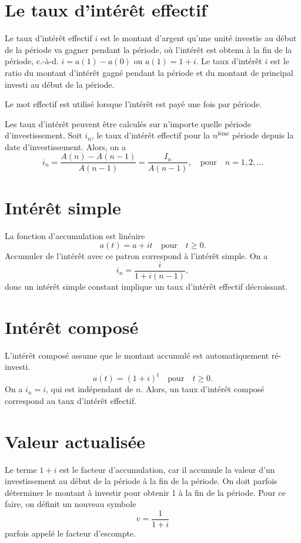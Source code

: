 \section{Le taux d'intérêt effectif}

\begin{definition}{}{}
	Le taux d'intérêt effectif $i$ est le montant d'argent qu'une unité investie au début de la période va gagner pendant la période, où l'intérêt est obtenu à la fin de la période, c.-à-d. $i = a(1) - a(0)$ ou $a(1) = 1 + i$.
	\tcblower
	Le taux d'intérêt $i$ est le ratio du montant d'intérêt gagné pendant la période et du montant de principal investi au début de la période. 
\end{definition}

Le mot effectif est utilisé lorsque l'intérêt est payé une fois par période. 

Les taux d'intérêt peuvent être calculés sur n'importe quelle période d'investissement. Soit $i_n$, le taux d'intérêt effectif pour la $n^\text{ième}$ période depuis la date d'investissement. Alors, on a 
$$i_n = \frac{A(n) - A(n-1)}{A(n-1)} = \frac{I_n}{A(n-1)}, \quad \text{pour} \quad n = 1, 2, \dots$$

\section{Intérêt simple}

La fonction d'accumulation est linéaire
$$a(t) = a + it \quad \text{pour} \quad t\geq 0.$$ Accumuler de l'intérêt avec ce patron correspond à l'intérêt simple. On a 
$$i_n = \frac{i}{1 + i(n-1)},$$
donc un intérêt simple constant implique un taux d'intérêt effectif décroissant. 

\section{Intérêt composé}
L'intérêt composé assume que le montant accumulé est automatiquement ré-investi. 
$$a(t) = (1 + i)^t \quad \text{pour} \quad t\geq 0.$$
On a $i_n = i$, qui est indépendant de $n$. Alors, un taux d'intérêt composé correspond au taux d'intérêt effectif. 

\section{Valeur actualisée}

Le terme $1 + i$ est le facteur d'accumulation, car il accumule la valeur d'un investissement au début de la période à la fin de la période. On doit parfois déterminer le montant à investir pour obtenir 1 à la fin de la période. Pour ce faire, on définit un nouveau symbole $$v = \frac{1}{1 + i}$$ parfois appelé le facteur d'escompte. 

